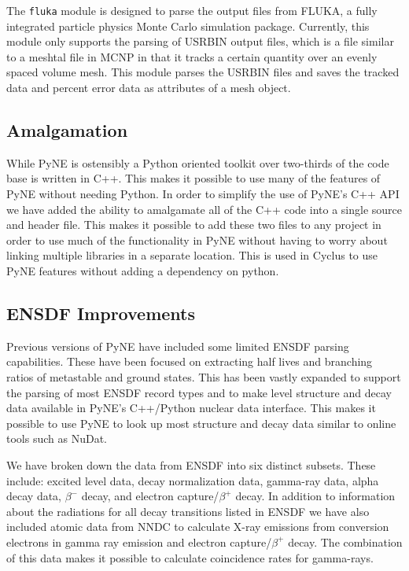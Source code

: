 \documentclass{anstrans}
\begin{document}
The \texttt{fluka} module is designed to parse the output files from FLUKA, a fully 
integrated particle physics Monte Carlo simulation package. Currently, 
this module only supports the parsing of USRBIN output files, which is 
a file similar to a meshtal file in MCNP in that it tracks a certain 
quantity over an evenly spaced volume mesh. This module parses the USRBIN 
files and saves the tracked data and percent error data as attributes of 
a mesh object.

\subsection{Amalgamation}

While PyNE is ostensibly a Python oriented toolkit over two-thirds 
of the code base is written in C++. This makes it possible to use many 
of the features of PyNE without needing Python. In order to simplify 
the use of PyNE's C++ API we have added the ability to amalgamate all 
of the C++ code into a single source and header file. This makes it 
possible to add these two files to any project in order to use much of the 
functionality in PyNE without having to worry about linking multiple 
libraries in a separate location. This is used in Cyclus 
\cite{carlsen_cyclus_2014} to use PyNE features without adding a dependency on 
python.

\subsection{ENSDF Improvements}

Previous versions of PyNE have included some limited ENSDF parsing capabilities. 
These have been focused on extracting half lives and branching ratios of 
metastable and ground states. This has been vastly expanded to support the 
parsing of most ENSDF record types and to make level structure and decay data 
available in PyNE's C++/Python nuclear data interface. This makes it possible 
to use PyNE to look up most structure and decay data similar to online tools
such as NuDat. 

We have broken down the data from ENSDF into six distinct subsets. These 
include: excited level data, decay normalization data, gamma-ray data, alpha 
decay data, $\beta^-$ decay, and electron capture/$\beta^+$ decay. In addition 
to information about the radiations for all decay transitions listed in ENSDF we 
have also included atomic data from NNDC to calculate X-ray emissions from 
conversion electrons in gamma ray emission and electron capture/$\beta^+$ decay.
The combination of this data makes it possible to calculate coincidence rates for
gamma-rays.
\end{document}
